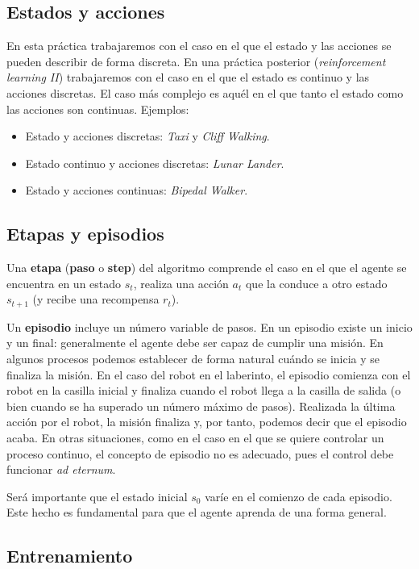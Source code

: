 \documentclass{article}
\begin{document}
\subsection{Estados y acciones}
En esta práctica trabajaremos con el caso en el que el estado y las acciones se pueden describir de forma discreta. En una práctica posterior (\textit{reinforcement learning II}) trabajaremos con el caso en el que el estado es continuo y las acciones discretas. El caso más complejo es aquél en el que tanto el estado como las acciones son continuas. Ejemplos:
\begin{itemize}
    \item Estado y acciones discretas: \textit{Taxi} y \textit{Cliff Walking}.
    \item Estado continuo y acciones discretas: \textit{Lunar Lander}.
    \item Estado y acciones continuas: \textit{Bipedal Walker}.
\end{itemize}


\subsection{Etapas y episodios}
Una \textbf{etapa} (\textbf{paso} o \textbf{step}) del algoritmo comprende el caso en el que el agente se encuentra en un estado $s_t$, realiza una acción $a_t$ que la conduce a otro estado $s_{t+1}$ (y recibe una recompensa $r_{t}$).

Un \textbf{episodio} incluye un número variable de pasos. En un episodio existe un inicio y un final: generalmente el agente debe ser capaz de cumplir una misión. En algunos procesos podemos establecer de forma natural cuándo se inicia y se finaliza la misión. En el caso del robot en el laberinto, el episodio comienza con el robot en la casilla inicial y finaliza cuando el robot llega a la casilla de salida (o bien cuando se ha superado un número máximo de pasos). Realizada la última acción por el robot, la misión finaliza y, por tanto, podemos decir que el episodio acaba. En otras situaciones, como en el caso en el que se quiere controlar un proceso continuo, el concepto de episodio no es adecuado, pues el control debe funcionar \textit{ad eternum}. %

Será importante que el estado inicial $s_0$ varíe en el comienzo de cada episodio. Este hecho es fundamental para que el agente aprenda de una forma general.

\subsection{Entrenamiento}
\end{document}
